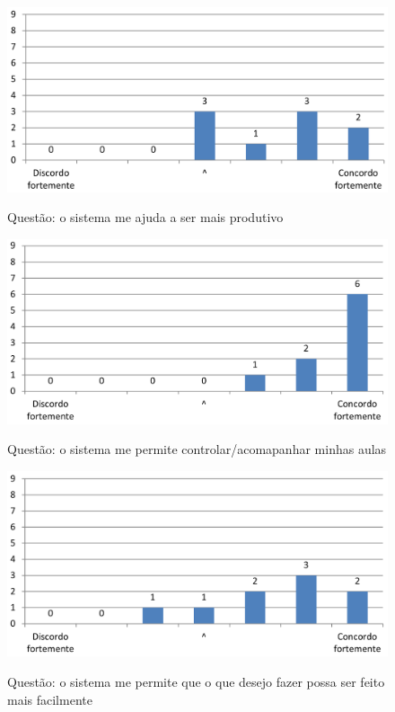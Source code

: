 \begin{figure}[ht]
\centering
\caption{Questão: o sistema me ajuda a ser mais produtivo}
\includegraphics[width=1.0\textwidth]{use/mais_produtivo.pdf} 
\label{fig:mais_produtivo} 
\end{figure}


\begin{figure}[ht]
\centering
\caption{Questão: o sistema me permite controlar/acomapanhar minhas aulas}
\includegraphics[width=1.0\textwidth]{use/controlar_aula.pdf} 
\label{fig:permite_controlar} 
\end{figure}



\begin{figure}[ht]
\centering
\caption{Questão: o sistema me permite que o que desejo fazer possa ser feito mais facilmente}
\includegraphics[width=1.0\textwidth]{use/mais_facilmente.pdf} 
\label{fig:mais_facilmente} 
\end{figure}


